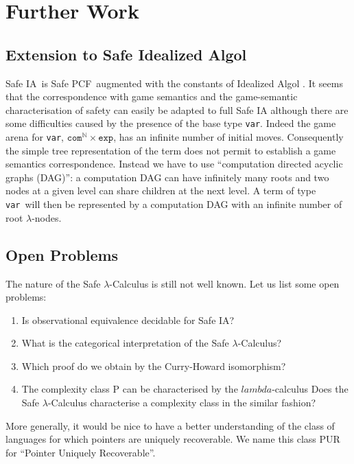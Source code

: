\documentclass{llncs}
\newcommand\nat{\mathbb{N}}
\newcommand\ialgol{\textsf{IA}}
\newcommand\iacom{\texttt{com}}
\newcommand\iaexp{\texttt{exp}}
\newcommand\iavar{\texttt{var}}
\newcommand\pcf{\textsf{PCF}}
\begin{document}
\section{Further Work}

\subsection{Extension to Safe Idealized Algol}

Safe \ialgol\ is Safe \pcf\ augmented with the constants of Idealized Algol
\cite{Reynolds81}. It seems that the correspondence with game semantics and the game-semantic characterisation
of safety can easily be adapted to full Safe \textsf{IA}
although there are some difficulties caused by the presence of the base type \iavar. Indeed the game arena for \iavar, $\iacom^{\nat} \times \iaexp$, has an infinite number of
initial moves. Consequently the simple tree representation of the term does not permit to establish a game semantics correspondence.
Instead we have to use ``computation directed acyclic graphs (DAG)'': a computation DAG can
have infinitely many roots and two nodes at a given level can share children at the next level.
A term of type \iavar\ will then be represented by a computation DAG with an infinite number of root $\lambda$-nodes.

\subsection{Open Problems}

The nature of the Safe $\lambda$-Calculus is still not well known. Let us list some open problems:
\begin{enumerate}
\item Is observational equivalence decidable for Safe \ialgol?
\item What is the categorical interpretation of the Safe $\lambda$-Calculus?
\item Which proof do we obtain by the Curry-Howard isomorphism?
\item The complexity class P can be characterised by the $lambda$-calculus \cite{DBLP:conf/tlca/LeivantM93}
Does the Safe $\lambda$-Calculus characterise a complexity class in the
similar fashion?
\end{enumerate}

More generally, it would be nice to have a better understanding of the class of languages for
which pointers are uniquely recoverable. We name this class PUR for
``Pointer Uniquely Recoverable''.
\end{document}
